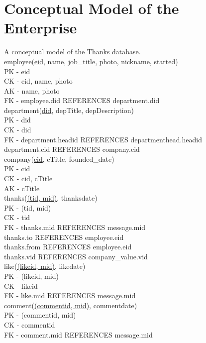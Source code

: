\documentclass[11pt]{report}
\begin{document}
\section{Conceptual Model of the Enterprise}
A conceptual model of the Thanks database. \\

employee(\underline{eid}, name, job\_title, photo, nickname, started) \\
PK - eid \\
CK - eid, name, photo \\
AK - name, photo \\
FK - employee.did REFERENCES department.did \\


department(\underline{did}, depTitle, depDescription) \\
PK - did \\
CK - did \\
FK - department.headid REFERENCES departmenthead.headid \\
     department.cid REFERENCES company.cid \\

company(\underline{cid}, cTitle, founded\_date) \\
PK - cid \\
CK - cid, cTitle \\
AK - cTitle \\

thanks(\underline{(tid, mid)}, thanksdate) \\
PK - (tid, mid) \\
CK - tid \\
FK - thanks.mid REFERENCES message.mid \\
     thanks.to REFERENCES employee.eid \\
     thanks.from REFERENCES employee.eid \\
     thanks.vid REFERENCES company\_value.vid \\

like(\underline{(likeid, mid)}, likedate) \\
PK - (likeid, mid) \\
CK - likeid \\
FK - like.mid REFERENCES message.mid \\

comment(\underline{(commentid, mid)}, commentdate) \\
PK - (commentid, mid) \\
CK - commentid \\
FK - comment.mid REFERENCES message.mid \\
\end{document}
